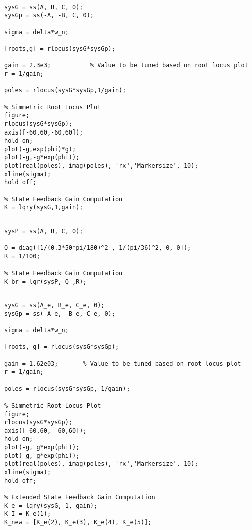 \begin{lstlisting}[caption={LQR obtained using argumentations based on SRL.}, label={lst:lqr-srl}]
%% LQR obtained using argumentations based on Simmetric Root Locus (SRL)

sysG = ss(A, B, C, 0);
sysGp = ss(-A, -B, C, 0);

sigma = delta*w_n;

[roots,g] = rlocus(sysG*sysGp);

gain = 2.3e3;           % Value to be tuned based on root locus plot
r = 1/gain;       

poles = rlocus(sysG*sysGp,1/gain);

% Simmetric Root Locus Plot
figure;
rlocus(sysG*sysGp);
axis([-60,60,-60,60]);
hold on;
plot(-g,exp(phi)*g);
plot(-g,-g*exp(phi));
plot(real(poles), imag(poles), 'rx','Markersize', 10);
xline(sigma);
hold off;

% State Feedback Gain Computation
K = lqry(sysG,1,gain);
\end{lstlisting}
\begin{lstlisting}[caption={LQR obtained using the Bryson’s rule.}, label={lst:lqr-br}]
%% LQR obtained using the Bryson's rule

sysP = ss(A, B, C, 0);

Q = diag([1/(0.3*50*pi/180)^2 , 1/(pi/36)^2, 0, 0]);
R = 1/100;

% State Feedback Gain Computation
K_br = lqr(sysP, Q ,R);
\end{lstlisting}
\begin{lstlisting}[caption={Robust tracking with LQR obtained using argumentations based on SRL.}, label={lst:lqr-srl-robust}]
%% Robust tracking with LQR obtained using argumentations based on Simmetric Root Locus (SRL)

sysG = ss(A_e, B_e, C_e, 0);
sysGp = ss(-A_e, -B_e, C_e, 0);

sigma = delta*w_n;

[roots, g] = rlocus(sysG*sysGp);

gain = 1.62e03;       % Value to be tuned based on root locus plot
r = 1/gain;

poles = rlocus(sysG*sysGp, 1/gain);

% Simmetric Root Locus Plot
figure;
rlocus(sysG*sysGp);
axis([-60,60, -60,60]);
hold on;
plot(-g, g*exp(phi));
plot(-g,-g*exp(phi));
plot(real(poles), imag(poles), 'rx','Markersize', 10);
xline(sigma);
hold off;

% Extended State Feedback Gain Computation
K_e = lqry(sysG, 1, gain);
K_I = K_e(1);
K_new = [K_e(2), K_e(3), K_e(4), K_e(5)];
\end{lstlisting}
